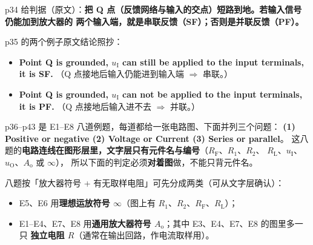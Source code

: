 \documentclass[11pt]{ctexart}
\begin{document}
p34 给判据（原文）：\textbf{把 Q 点（反馈网络与输入的交点）短路到地。若输入信号仍能加到放大器的
两个输入端，就是串联反馈（SF）；否则是并联反馈（PF）。}

p35 的两个例子原文结论照抄：
\begin{itemize}
\item \textbf{Point Q is grounded, $u_{\mathrm{I}}$ can still be applied to the input terminals, it is SF.}
（Q 点接地后输入仍能进到输入端 $\Rightarrow$ 串联。）
\item \textbf{Point Q is grounded, $u_{\mathrm{I}}$ can not be applied to the input terminals, it is PF.}
（Q 点接地后输入进不去 $\Rightarrow$ 并联。）
\end{itemize}


p36--p43 是 E1--E8 八道例题，每道都给一张电路图、下面并列三个问题：
\textbf{(1) Positive or negative (2) Voltage or Current (3) Series or parallel}。
这八题的\textbf{电路连线在图形层里，文字层只有元件名与编号}（$R_{\mathrm{F}}$、$R_1$、$R_2$、
$R_{\mathrm{L}}$、$u_{\mathrm{I}}$、$u_{\mathrm{O}}$、$A_{\mathrm{o}}$ 或 $\infty$），
所以下面的判定必须\textbf{对着图}做，不能只背元件名。

八题按「放大器符号 + 有无取样电阻」可先分成两类（可从文字层确认）：

\begin{itemize}
\item E5、E6 用\textbf{理想运放符号 $\infty$}（图上有 $R_1$、$R_2$、$R_{\mathrm{F}}$、$R_{\mathrm{L}}$）；
\item E1--E4、E7、E8 用\textbf{通用放大器符号 $A_{\mathrm{o}}$}；其中 E3、E4、E7、E8 的图里多一只
\textbf{独立电阻 $R$}（通常在输出回路，作电流取样用）。
\end{itemize}


\end{document}
